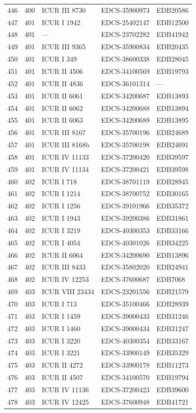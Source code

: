 \begin{longtable}{@{}r r l l l@{}}
446 & 400 & ICUR III 8730 & EDCS-35900973 & EDB20586 \\
447 & 401 & ICUR I 1942 & EDCS-25402147 & EDB12500 \\
448 & 401 & — & EDCS-23702282 & EDB41942 \\
449 & 401 & ICUR III 9365 & EDCS-35900834 & EDB20435 \\
450 & 401 & ICUR I 349 & EDCS-38600338 & EDB28045 \\
451 & 401 & ICUR II 4506 & EDCS-34100569 & EDB19793 \\
452 & 401 & ICUR II 4836 & EDCS-36101314 & — \\
453 & 401 & ICUR II 6061 & EDCS-34200687 & EDB13893 \\
454 & 401 & ICUR II 6062 & EDCS-34200688 & EDB13894 \\
455 & 401 & ICUR II 6063 & EDCS-34200689 & EDB13895 \\
456 & 401 & ICUR III 8167 & EDCS-35700196 & EDB24689 \\
457 & 401 & ICUR III 8168b & EDCS-35700198 & EDB24691 \\
458 & 401 & ICUR IV 11133 & EDCS-37200420 & EDB39597 \\
459 & 401 & ICUR IV 11134 & EDCS-37200421 & EDB39598 \\
460 & 402 & ICUR I 718 & EDCS-38701119 & EDB28945 \\
461 & 402 & ICUR I 1214 & EDCS-38700752 & EDB30165 \\
462 & 402 & ICUR I 1256 & EDCS-39101966 & EDB35372 \\
463 & 402 & ICUR I 1943 & EDCS-39200386 & EDB31861 \\
464 & 402 & ICUR I 3219 & EDCS-40300353 & EDB33166 \\
465 & 402 & ICUR I 4054 & EDCS-40301026 & EDB34225 \\
466 & 402 & ICUR II 6064 & EDCS-34200690 & EDB13896 \\
467 & 402 & ICUR III 8433 & EDCS-35802020 & EDB24941 \\
468 & 402 & ICUR IV 12253 & EDCS-37600687 & EDB7068 \\
469 & 403 & ICUR VIII 23434 & EDCS-23201556 & EDB21579 \\
470 & 403 & ICUR I 713 & EDCS-35100466 & EDB28939 \\
471 & 403 & ICUR I 1459 & EDCS-39000433 & EDB31246 \\
472 & 403 & ICUR I 1460 & EDCS-39000434 & EDB31247 \\
473 & 403 & ICUR I 3220 & EDCS-40300354 & EDB33167 \\
474 & 403 & ICUR I 3221 & EDCS-33900149 & EDB35329 \\
475 & 403 & ICUR II 4272 & EDCS-33900178 & EDB11273 \\
476 & 403 & ICUR II 4507 & EDCS-34100570 & EDB19794 \\
477 & 403 & ICUR IV 11136 & EDCS-37200423 & EDB39600 \\
478 & 403 & ICUR IV 12425 & EDCS-37600948 & EDB41721 \\
\end{longtable}
